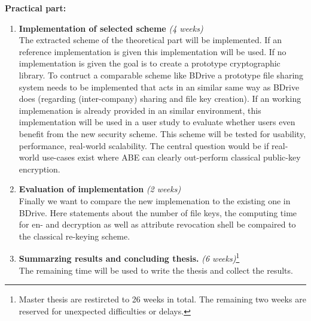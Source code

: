 \documentclass[twocolumn]{article}
\begin{document}
\noindent \textbf{Practical part:}
\begin{enumerate}
	\item\textbf{Implementation of selected scheme} \textit{(4 weeks)}\\
		  The extracted scheme of the theoretical part will be implemented. If an reference implementation is given this implementation will be used. If no implementation is given the goal is to create a prototype cryptographic library. To contruct a comparable scheme like BDrive a prototype file sharing system needs to be implemented that acts in an similar same way as BDrive does (regarding (inter-company) sharing and file key creation). 
		  If an working implemenation is already provided in an similar environment, this implementation will be used in a user study to evaluate whether users even benefit from the new security scheme. This scheme will be tested for usability, performance, real-world scalability. The central question would be if real-world use-cases exist where ABE can clearly out-perform classical public-key encryption.

	\item\textbf{Evaluation of implementation} \textit{(2 weeks)}\\
		  Finally we want to compare the new implemenation to the existing one in BDrive. Here statements about the number of file keys, the computing time for en- and decryption as well as attribute revocation shell be compaired to the classical re-keying scheme.
		  
	\item\textbf{Summarzing results and concluding thesis.} \textit{(6 weeks)}\footnote{Master thesis are restircted to 26 weeks in total. The remaining two weeks are reserved for unexpected difficulties or delays.}\\
		  The remaining time will be used to write the thesis and collect the results.   
\end{enumerate}
\end{document}
